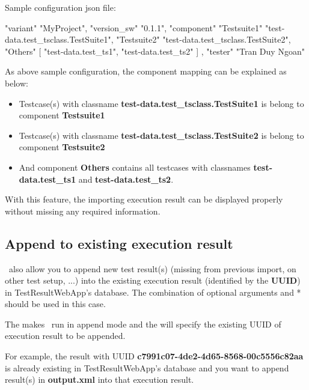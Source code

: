 Sample configuration json file:

\begin{pythoncode}
{
   "variant"      "MyProject",
   "version_sw"   "0.1.1",
   "component"    {
      "Testsuite1"      "test-data.test_tsclass.TestSuite1",
      "Testsuite2"      "test-data.test_tsclass.TestSuite2",
      "Others"          [
         "test-data.test_ts1",
         "test-data.test_ts2"
      ]
   },
   "tester"       "Tran Duy Ngoan"
}
\end{pythoncode}

As above sample configuration, the component mapping can be explained as
below:

\begin{itemize}
\tightlist
\item
  Testcase(s) with classname \textbf{test-data.test\_tsclass.TestSuite1}
  is belong to component \textbf{Testsuite1}
\item
  Testcase(s) with classname \textbf{test-data.test\_tsclass.TestSuite2}
  is belong to component \textbf{Testsuite2}
\item
  And component \textbf{Others} contains all testcases with classnames
  \textbf{test-data.test\_ts1} and \textbf{test-data.test\_ts2}.
\end{itemize}

With this feature, the importing execution result can be displayed
properly without missing any required information.

\hypertarget{append-to-existing-execution-result}{%
\subsection{Append to existing execution
result}\label{append-to-existing-execution-result}}

\pkg\ also allow you to append new test result(s) (missing from
previous import, on other test setup, ...) into the existing execution
result (identified by the \textbf{UUID}) in TestResultWebApp's database. 
The combination of optional arguments  and * 
should be used in this case.

The  makes \pkg\ run in append mode and the  
will specify the existing UUID of execution result to be appended.

For example, the result with UUID
\textbf{c7991c07-4de2-4d65-8568-00c5556c82aa} is already existing in
TestResultWebApp's database and you want to append
result(s) in \textbf{output.xml} into that execution result.


